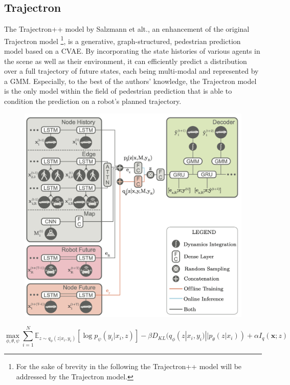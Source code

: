 \subsection{Trajectron}
The Trajectron++ model \cite{Salzmann2020} by Salzmann et alt., an enhancement of the original Trajectron model \cite{Ivanovic2018}\footnote{For the sake of brevity in the following the Trajectron++ model will be addressed by the Trajectron model.}, is a generative, graph-structured, pedestrian prediction model based on a C\ac{VAE}. By incorporating the state histories of various agents in the scene as well as their environment, it can efficiently predict a distribution over a full trajectory of future states, each being multi-modal and represented by a \ac{GMM}. Especially, to the best of the authors' knowledge, the Trajectron model is the only model within the field of pedestrian prediction that is able to condition the prediction on a robot's planned trajectory.

\begin{figure}[!ht]
\begin{center}
\includegraphics[width=\imgwidth]{images/trajectron++.png}
\label{img:trajectron_model}
\end{center}
\end{figure}

\begin{equation}
\max_{\phi, \theta, \psi} \sum_{i=1}^N \mathbb{E}_{z \sim q_{\phi}(z | x_i, y_i)} [\log p_\psi (y_i | x_i, z)] - \beta D_{KL} (q_{\phi}(z | x_i, y_i) || p_{\theta}(z | x_i)) + \alpha I_q(\boldsymbol{x}; z)
\label{eq:trajectron_loss}
\end{equation}

